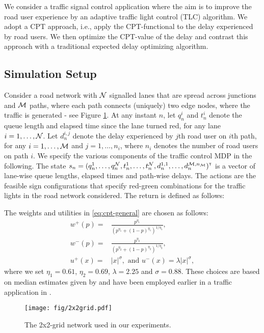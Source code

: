 We consider a traffic signal control application where the aim is to improve the road user experience by an adaptive traffic light control (TLC) algorithm.
We adopt a CPT approach, i.e., apply the CPT-functional to the delay experienced by road users. We then optimize the CPT-value of the delay  and contrast this approach with a traditional expected delay optimizing algorithm.

\subsection{Simulation Setup}  
Consider a road network with $\mathcal{N}$ signalled lanes that are spread across junctions and $\mathcal{M}$ paths, where each path connects (uniquely) two edge nodes, where the traffic is generated - see Figure \ref{fig:2x2grid}.
At any instant $n$, let $q_n^i$ and $t_n^i$ denote the queue length and elapsed time since the lane turned red, for any lane $i = 1,\ldots, \mathcal{N}$. Let $d_n^{i,j}$ denote the delay experienced by $j$th road user on $i$th path, for any $i=1,\ldots,\mathcal{M}$ and $j=1,\ldots,n_i$, where $n_i$ denotes the number of road users on path $i$.
We specify the various components of the traffic control MDP in the following.
The state $s_n=(q_n^1,\ldots,q_n^{\mathcal{N}},t_n^1,\ldots,t_n^{\mathcal{N}},d_n^{1,1},\ldots,d_n^{\mathcal{M},n_{\mathcal{M}}})^\mathsf{\scriptscriptstyle T}$ is a vector of lane-wise queue lengths, elapsed times and path-wise delays.
The actions are the feasible sign configurations that specify red-green combinations for the traffic lights in the road network considered. 
The return is defined as follows:
  


The weights and utilities in \eqref{eq:cpt-general} are chosen as follows:
\begin{align*}
w^+(p) = &\frac{p^{\eta_1}}{{(p^{\eta_1}+ (1-p)^{\eta_1})}^{1/\eta_1}}, \\
w^-(p) =& \frac{p^{\eta_2}}{{(p^{\eta_2}+ (1-p)^{\eta_2})}^{1/\eta_2}},\\
u^+(x) = & |x|^{\sigma}, \text{ and }  u^-(x) = \lambda |x|^{\sigma},
\end{align*}
where we set $\eta_1 = 0.61$, $\eta_2 = 0.69$, $\lambda = 2.25$ and $\sigma = 0.88$. These choices are based on median estimates given by \cite{tversky1992advances} and have been employed earlier in a traffic application in \cite{gao2010adaptive}.
 
\begin{figure}
\centering
        \texttt{[image: fig/2x2grid.pdf]}
  \caption{The 2x2-grid network used in our experiments.}
\label{fig:2x2grid}
  \end{figure}


